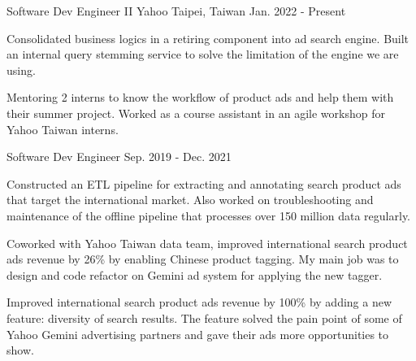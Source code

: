 

\begin{cventries}

  \cventry
    {Software Dev Engineer II} %
    {Yahoo} %
    {Taipei, Taiwan} %
    {Jan. 2022 - Present} %
    {
      \begin{cvitems} %
        \item {Consolidated business logics in a retiring component into ad search engine. Built an internal query stemming service to solve the limitation of the engine we are using.}
        \item {Mentoring 2 interns to know the workflow of product ads and help them with their summer project. Worked as a course assistant in an agile workshop for Yahoo Taiwan interns.}
      \end{cvitems}
    }

  \cventry
    {Software Dev Engineer} %
    {} %
    {} %
    {Sep. 2019 - Dec. 2021} %
    {
      \begin{cvitems} %
        \item {Constructed an ETL pipeline for extracting and annotating search product ads that target the international market. Also worked on troubleshooting and maintenance of the offline pipeline that processes over 150 million data regularly.}
        \item {Coworked with Yahoo Taiwan data team, improved international search product ads revenue by 26\% by enabling Chinese product tagging. My main job was to design and code refactor on Gemini ad system for applying the new tagger.}
        \item {Improved international search product ads revenue by 100\% by adding a new feature: diversity of search results. The feature solved the pain point of some of Yahoo Gemini advertising partners and gave their ads more opportunities to show.}
      \end{cvitems}
    }


\end{cventries}
